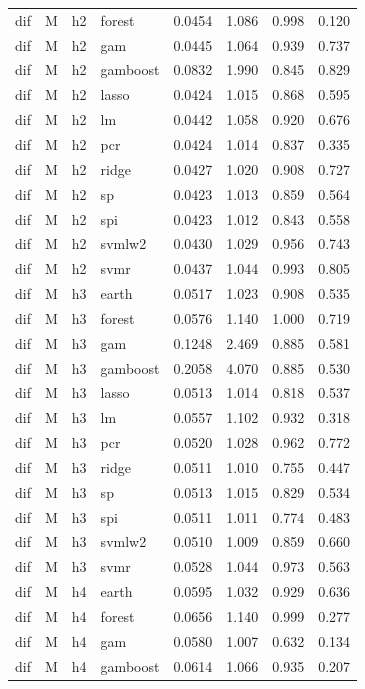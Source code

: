 \begin{ThreePartTable}
\begin{longtable}[t]{llclcccc}
dif & M & h2 & forest & 0.0454 & 1.086 & 0.998 & 0.120\\
dif & M & h2 & gam & 0.0445 & 1.064 & 0.939 & 0.737\\
dif & M & h2 & gamboost & 0.0832 & 1.990 & 0.845 & 0.829\\
dif & M & h2 & lasso & 0.0424 & 1.015 & 0.868 & 0.595\\
dif & M & h2 & lm & 0.0442 & 1.058 & 0.920 & 0.676\\
dif & M & h2 & pcr & 0.0424 & 1.014 & 0.837 & 0.335\\
dif & M & h2 & ridge & 0.0427 & 1.020 & 0.908 & 0.727\\
dif & M & h2 & sp & 0.0423 & 1.013 & 0.859 & 0.564\\
dif & M & h2 & spi & 0.0423 & 1.012 & 0.843 & 0.558\\
dif & M & h2 & svmlw2 & 0.0430 & 1.029 & 0.956 & 0.743\\
dif & M & h2 & svmr & 0.0437 & 1.044 & 0.993 & 0.805\\
\addlinespace
dif & M & h3 & earth & 0.0517 & 1.023 & 0.908 & 0.535\\
dif & M & h3 & forest & 0.0576 & 1.140 & 1.000 & 0.719\\
dif & M & h3 & gam & 0.1248 & 2.469 & 0.885 & 0.581\\
dif & M & h3 & gamboost & 0.2058 & 4.070 & 0.885 & 0.530\\
dif & M & h3 & lasso & 0.0513 & 1.014 & 0.818 & 0.537\\
dif & M & h3 & lm & 0.0557 & 1.102 & 0.932 & 0.318\\
dif & M & h3 & pcr & 0.0520 & 1.028 & 0.962 & 0.772\\
dif & M & h3 & ridge & 0.0511 & 1.010 & 0.755 & 0.447\\
dif & M & h3 & sp & 0.0513 & 1.015 & 0.829 & 0.534\\
dif & M & h3 & spi & 0.0511 & 1.011 & 0.774 & 0.483\\
dif & M & h3 & svmlw2 & 0.0510 & 1.009 & 0.859 & 0.660\\
dif & M & h3 & svmr & 0.0528 & 1.044 & 0.973 & 0.563\\
\addlinespace
dif & M & h4 & earth & 0.0595 & 1.032 & 0.929 & 0.636\\
dif & M & h4 & forest & 0.0656 & 1.140 & 0.999 & 0.277\\
dif & M & h4 & gam & 0.0580 & 1.007 & 0.632 & 0.134\\
dif & M & h4 & gamboost & 0.0614 & 1.066 & 0.935 & 0.207\\

\end{longtable}
\end{ThreePartTable}
